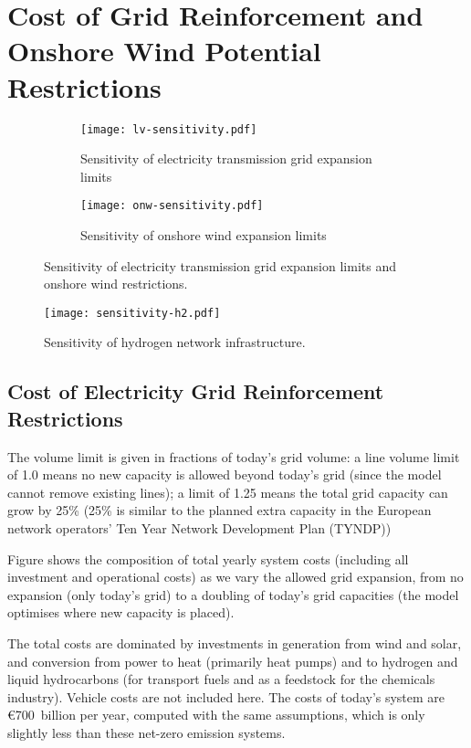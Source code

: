 \section{Cost of Grid Reinforcement and Onshore Wind Potential Restrictions}
\label{sec:si:sensitivity-lv-onw}

\begin{figure}
    \centering
    \begin{subfigure}[t]{\textwidth}
        \centering
        \caption{Sensitivity of electricity transmission grid expansion limits}
        \texttt{[image: lv-sensitivity.pdf]}
    \end{subfigure}
    \begin{subfigure}[t]{\textwidth}
        \centering
        \caption{Sensitivity of onshore wind expansion limits}
        \texttt{[image: onw-sensitivity.pdf]}
    \end{subfigure}
    \caption{Sensitivity of electricity transmission grid expansion limits and onshore wind restrictions.}
    \label{fig:lv-onw-restriction}
\end{figure}

\begin{SCfigure}
    \centering
    \texttt{[image: sensitivity-h2.pdf]}
    \caption{Sensitivity of hydrogen network infrastructure.}
    \label{fig:h2-restriction}
\end{SCfigure}

\subsection{Cost of Electricity Grid Reinforcement Restrictions}
\label{sec:si:lv}

The volume limit is given in fractions of today's grid volume: a
line volume limit of 1.0 means no new capacity is allowed beyond today's grid
(since the model cannot remove existing lines); a limit of 1.25 means the total
grid capacity can grow by 25\% (25\% is similar to the planned extra capacity in
the European network operators' Ten Year Network Development Plan (TYNDP)\cite{TYNDP2016})

Figure shows the composition of total yearly system costs
(including all investment and operational costs) as we vary the allowed
grid expansion, from no expansion (only today's grid) to
a doubling of today's grid capacities (the model optimises where new
capacity is placed).

The total costs are dominated by investments in generation from wind
and solar, and conversion from power to heat (primarily heat pumps)
and to hydrogen and liquid hydrocarbons (for transport fuels and as a
feedstock for the chemicals industry). Vehicle costs are not included
here. The costs of today's system are \euro700~billion per year,
computed with the same assumptions, which is only slightly less than
these net-zero emission systems.

